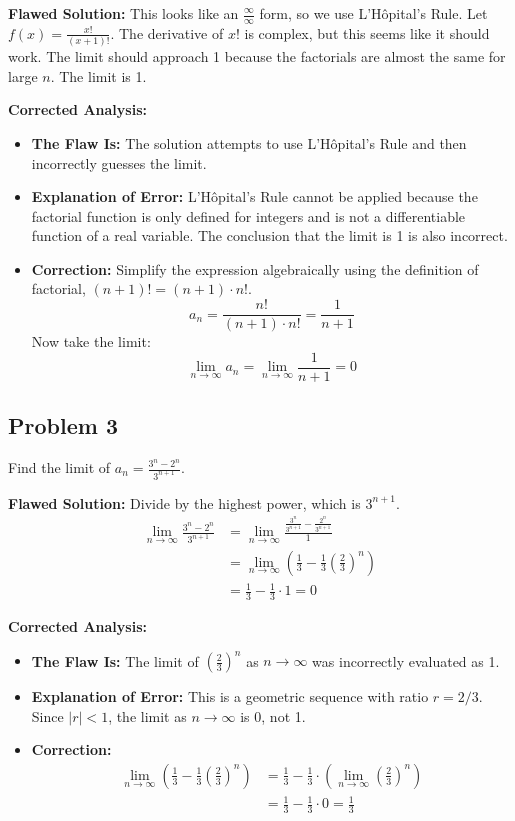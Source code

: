 \documentclass{article}
\begin{document}
\textbf{Flawed Solution:}
This looks like an $\frac{\infty}{\infty}$ form, so we use L'Hôpital's Rule. Let $f(x) = \frac{x!}{(x+1)!}$. The derivative of $x!$ is complex, but this seems like it should work. The limit should approach 1 because the factorials are almost the same for large $n$. The limit is 1.

\textbf{Corrected Analysis:}
\begin{itemize}
    \item \textbf{The Flaw Is:} The solution attempts to use L'Hôpital's Rule and then incorrectly guesses the limit.
    \item \textbf{Explanation of Error:} L'Hôpital's Rule cannot be applied because the factorial function is only defined for integers and is not a differentiable function of a real variable. The conclusion that the limit is 1 is also incorrect.
    \item \textbf{Correction:} Simplify the expression algebraically using the definition of factorial, $(n+1)! = (n+1) \cdot n!$.
    \[ a_n = \frac{n!}{(n+1) \cdot n!} = \frac{1}{n+1} \]
    Now take the limit:
    \[ \lim_{n \to \infty} a_n = \lim_{n \to \infty} \frac{1}{n+1} = 0 \]
\end{itemize}

\subsection{Problem 3}
Find the limit of $a_n = \frac{3^n - 2^n}{3^{n+1}}$.

\textbf{Flawed Solution:}
Divide by the highest power, which is $3^{n+1}$.
\begin{align*}
    \lim_{n \to \infty} \frac{3^n - 2^n}{3^{n+1}} &= \lim_{n \to \infty} \frac{\frac{3^n}{3^{n+1}} - \frac{2^n}{3^{n+1}}}{1} \\
    &= \lim_{n \to \infty} \left( \frac{1}{3} - \frac{1}{3} \left(\frac{2}{3}\right)^n \right) \\
    &= \frac{1}{3} - \frac{1}{3} \cdot 1 = 0
\end{align*}

\textbf{Corrected Analysis:}
\begin{itemize}
    \item \textbf{The Flaw Is:} The limit of $(\frac{2}{3})^n$ as $n \to \infty$ was incorrectly evaluated as 1.
    \item \textbf{Explanation of Error:} This is a geometric sequence with ratio $r = 2/3$. Since $|r| < 1$, the limit as $n \to \infty$ is 0, not 1.
    \item \textbf{Correction:}
    \begin{align*}
        \lim_{n \to \infty} \left( \frac{1}{3} - \frac{1}{3} \left(\frac{2}{3}\right)^n \right) &= \frac{1}{3} - \frac{1}{3} \cdot \left(\lim_{n \to \infty} \left(\frac{2}{3}\right)^n \right) \\
        &= \frac{1}{3} - \frac{1}{3} \cdot 0 = \frac{1}{3}
    \end{align*}
\end{itemize}
\end{document}

